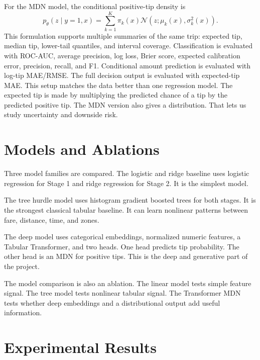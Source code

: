 \documentclass[11pt]{article}
\begin{document}
For the MDN model, the conditional positive-tip density is
\[
p_\theta(z \mid y=1,x)=\sum_{k=1}^K \pi_k(x)\mathcal{N}(z;\mu_k(x),\sigma_k^2(x)).
\]
This formulation supports multiple summaries of the same trip: expected tip, median tip, lower-tail quantiles, and interval coverage. Classification is evaluated with ROC-AUC, average precision, log loss, Brier score, expected calibration error, precision, recall, and F1. Conditional amount prediction is evaluated with log-tip MAE/RMSE. The full decision output is evaluated with expected-tip MAE.
This setup matches the data better than one regression model. The expected tip is made by multiplying the predicted chance of a tip by the predicted positive tip. The MDN version also gives a distribution. That lets us study uncertainty and downside risk.

\section{Models and Ablations}
Three model families are compared. The logistic and ridge baseline uses logistic regression for Stage 1 and ridge regression for Stage 2. It is the simplest model.

The tree hurdle model uses histogram gradient boosted trees for both stages. It is the strongest classical tabular baseline. It can learn nonlinear patterns between fare, distance, time, and zones.

The deep model uses categorical embeddings, normalized numeric features, a Tabular Transformer, and two heads. One head predicts tip probability. The other head is an MDN for positive tips. This is the deep and generative part of the project.

The model comparison is also an ablation. The linear model tests simple feature signal. The tree model tests nonlinear tabular signal. The Transformer MDN tests whether deep embeddings and a distributional output add useful information.

\section{Experimental Results}
\begin{table}[H]
\centering
\caption{Final model comparison on the held-out 2025 test split.}
\end{table}
\end{document}
